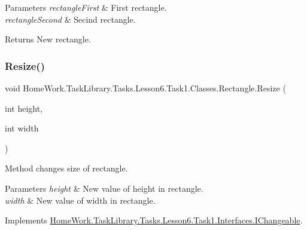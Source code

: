 \begin{DoxyParams}{Parameters}
{\em rectangle\+First} & First rectangle.\\
\hline
{\em rectangle\+Second} & Secind rectangle.\\
\hline
\end{DoxyParams}
\begin{DoxyReturn}{Returns}
New rectangle.
\end{DoxyReturn}
\mbox{\label{class_home_work_1_1_task_library_1_1_tasks_1_1_lesson6_1_1_task1_1_1_classes_1_1_rectangle_a84e67739744220cb808f5c679cd7bde0}} 
\subsubsection{\texorpdfstring{Resize()}{Resize()}}
{\footnotesize\ttfamily void Home\+Work.\+Task\+Library.\+Tasks.\+Lesson6.\+Task1.\+Classes.\+Rectangle.\+Resize (\begin{DoxyParamCaption}\item[{int}]{height,  }\item[{int}]{width }\end{DoxyParamCaption})}



Method changes size of rectangle. 


\begin{DoxyParams}{Parameters}
{\em height} & New value of height in rectangle.\\
\hline
{\em width} & New value of width in rectangle.\\
\hline
\end{DoxyParams}


Implements \mbox{\hyperlink{interface_home_work_1_1_task_library_1_1_tasks_1_1_lesson6_1_1_task1_1_1_interfaces_1_1_i_changeable_a706c404159fa36fe0a80cdb9f4fa3812}{Home\+Work.\+Task\+Library.\+Tasks.\+Lesson6.\+Task1.\+Interfaces.\+I\+Changeable}}.

\mbox{\label{class_home_work_1_1_task_library_1_1_tasks_1_1_lesson6_1_1_task1_1_1_classes_1_1_rectangle_a28c407ba36ffa8d869a461a315235cb1}} 
